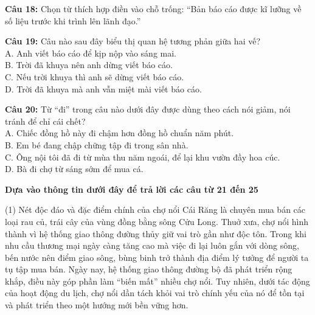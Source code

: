 \documentclass[12pt,a4paper]{article}
\begin{document}


\vspace{0.3cm}

\noindent \textbf{Câu 18:} Chọn từ thích hợp điền vào chỗ trống: ``Bản báo cáo được \underline{\hspace{1.5cm}} kĩ lưỡng về số liệu trước khi trình lên lãnh đạo.''\\
\noindent{}



\vspace{0.3cm}

\noindent \textbf{Câu 19:} Câu nào sau đây biểu thị quan hệ tương phản giữa hai vế?\\
\noindent A. Anh viết báo cáo để kịp nộp vào sáng mai.\\
\noindent B. Trời đã khuya nên anh dừng viết báo cáo.\\
\noindent C. Nếu trời khuya thì anh sẽ dừng viết báo cáo.\\
\noindent D. Trời đã khuya mà anh vẫn miệt mài viết báo cáo.



\vspace{0.3cm}

\noindent \textbf{Câu 20:} Từ ``đi'' trong câu nào dưới đây được dùng theo cách nói giảm, nói tránh để chỉ cái chết?\\
\noindent A. Chiếc đồng hồ này đi chậm hơn đồng hồ chuẩn năm phút.\\
\noindent B. Em bé đang chập chững tập đi trong sân nhà.\\
\noindent C. Ông nội tôi đã đi từ mùa thu năm ngoái, để lại khu vườn đầy hoa cúc.\\
\noindent D. Bà đi chợ từ sáng sớm để mua cá.



\vspace{0.5cm}
\noindent\textbf{Dựa vào thông tin dưới đây để trả lời các câu từ 21 đến 25}%


\par\nobreak

(1) Nét độc đáo và đặc điểm chính của chợ nổi Cái Răng là chuyên mua bán các loại rau củ, trái cây của vùng đồng bằng sông Cửu Long. Thuở xưa, chợ nổi hình thành vì hệ thống giao thông đường thủy giữ vai trò gần như độc tôn. Trong khi nhu cầu thương mại ngày càng tăng cao mà việc đi lại luôn gắn với dòng sông, bến nước nên điểm giao sông, bùng binh trở thành địa điểm lý tưởng để người ta tụ tập mua bán. Ngày nay, hệ thống giao thông đường bộ đã phát triển rộng khắp, điều này góp phần làm ``biến mất'' nhiều chợ nổi. Tuy nhiên, dưới tác động của hoạt động du lịch, chợ nổi dần tách khỏi vai trò chính yếu của nó để tồn tại và phát triển theo một hướng mới bền vững hơn.
\end{document}
